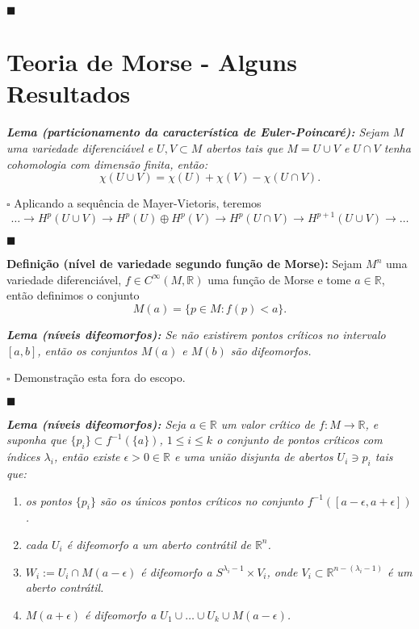 \documentclass{article}
\begin{document}
	$\blacksquare$
	
	\section{Teoria de Morse - Alguns Resultados}
	
	\textit{\textbf{Lema (particionamento da característica de Euler-Poincaré):} Sejam $M$ uma variedade diferenciável e $U, V \subset M$ abertos tais que $M = U \cup V$ e $U \cap V$ tenha cohomologia com dimensão finita, então:}
	$$
	\chi(U \cup V) = \chi(U) + \chi(V) - \chi(U \cap V).
	$$
	
	$\square$ Aplicando a sequência de Mayer-Vietoris, teremos
	$$
	\dots \to H^{p}(U \cup V) \to H^{p}(U) \oplus H^{p}(V) \to H^{p}(U  \cap V) \to H^{p+1}(U \cup V) \to \dots
	$$
	
	$\blacksquare$
	
	\vspace{2mm}
	\textbf{Definição (nível de variedade segundo função de Morse):} Sejam $M^{n}$ uma variedade diferenciável, $f \in C^{\infty}(M, \mathbb{R})$ uma função de Morse e tome $a \in \mathbb{R}$, então definimos o conjunto
	$$
	M(a) = \{p \in M: f(p) <a \}.
	$$
	
	\textit{\textbf{Lema (níveis difeomorfos):} Se não existirem pontos críticos no intervalo $[a, b]$, então os conjuntos $M(a)$ e $M(b)$ são difeomorfos.}
	
	$\square$ Demonstração esta fora do escopo.
	
	$\blacksquare$
	
	\vspace{2mm}
	\textit{\textbf{Lema (níveis difeomorfos):} Seja $a \in \mathbb{R}$ um valor crítico de $f:M \to \mathbb{R}$, e suponha que $\{p_{i}\} \subset f^{-1}(\{a\})$, $1\leq i \leq k$ o conjunto de pontos críticos com índices $\lambda_{i}$, então existe $\epsilon > 0 \in \mathbb{R}$ e uma união disjunta de abertos $U_{i} \ni p_{i}$ tais que:}
	\begin{enumerate}
	\item  \textit{os pontos $\{p_{i}\}$ são os únicos pontos críticos no conjunto $f^{-1}([a - \epsilon, a + \epsilon])$.}
	
	\item \textit{cada $U_{i}$ é difeomorfo a um aberto contrátil de $\mathbb{R}^{n}$.}
	
	\item \textit{$W_{i} := U_{i} \cap M(a-\epsilon)$ é difeomorfo a $S^{\lambda_{i} - 1} \times V_{i}$, onde $V_{i} \subset \mathbb{R}^{n - (\lambda_{i} - 1)}$ é um aberto contrátil.}
	
	\item \textit{$M(a+\epsilon)$ é difeomorfo a $U_{1} \cup \dots \cup U_{k} \cup M(a-\epsilon)$.}
	\end{enumerate}
	
\end{document}
